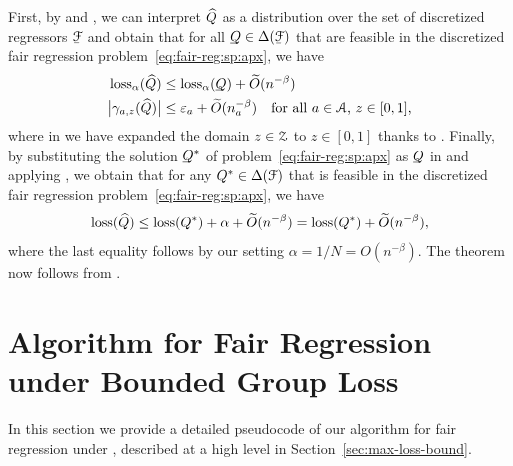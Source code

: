 First, by  and , we can interpret $\widehat{Q}$ as a distribution over the set of discretized regressors $\underF$ and obtain that for all $\underQ\in\Delta(\underF)$ that
are feasible in the discretized fair regression problem~\eqref{eq:fair-reg:sp:apx}, we have
%
\begin{align}
\label{eq:sp:app:5}
   \textup{\mdseries loss}_\alpha(\widehat{Q})
&
   \le
   \textup{\mdseries loss}_\alpha(\underline{\smash{Q}\!\!}\,\,)+\widetilde{O}(n^{-\beta})
\\
\label{eq:sp:app:6}
   \bigl\lvert\gamma_{a,z}(\widehat{Q})\bigr\rvert
&
   \le\varepsilon_{a}+\widetilde{O}(n_a^{-\beta})
\quad
\text{for all $a\in\mathcal{A}$, $z\in[0,1]$,}
\end{align}
%
where in  we have expanded the domain $z\in\mathcal{Z}$ to $z\in[0,1]$ thanks to . Finally, by substituting the solution $\underline{\smash{Q}\!\!}\,\,^*$ of problem~\eqref{eq:fair-reg:sp:apx} as $\underline{\smash{Q}\!\!}\,\,$ in  and
applying , we obtain that for any $Q^*\in\Delta(\mathcal{F})$ that is feasible in the discretized fair regression problem~\eqref{eq:fair-reg:sp:apx}, we have
%
\begin{equation}
\label{eq:sp:app:7}
   \textup{\mdseries loss}(\widehat{Q})
   \le
   \textup{\mdseries loss}(Q^*)+\alpha+\widetilde{O}(n^{-\beta})=\textup{\mdseries loss}(Q^*)+\widetilde{O}(n^{-\beta}),
\end{equation}
%
where the last equality follows by our setting $\alpha=1/N=O(n^{-\beta})$. The theorem now follows from .


\section{Algorithm for Fair Regression under Bounded Group Loss}
\label{sec:app:alg:ep}

In this section we provide a detailed pseudocode of our algorithm for fair regression under \epshort, described at a high level in Section~\ref{sec:max-loss-bound}.

